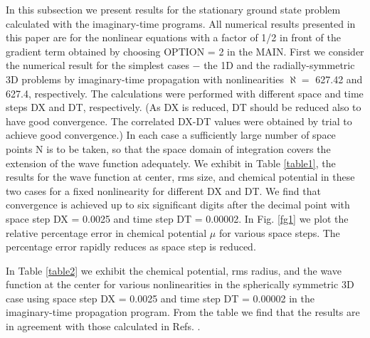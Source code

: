 \documentclass[onecolumn]{elsart3p}
\begin{document}
In this subsection we present results for the stationary ground 
state problem
calculated with the imaginary-time programs.
All numerical results presented in this paper are for the
nonlinear equations with a factor of 1/2 in front of the gradient term
obtained by choosing OPTION = 2 in the MAIN.
First we consider the numerical result for the simplest cases $-$ the
1D and the radially-symmetric 3D problems by
imaginary-time propagation with nonlinearities $\aleph %
=$ 627.42 
and
627.4, respectively. The calculations were performed with different
space and time steps DX and DT, respectively. (As DX is reduced, DT
should be reduced also to have good convergence. The correlated DX-DT
values were obtained by trial to achieve good convergence.)
In each case a
sufficiently large number of space points N is to be taken, so that the
space domain of integration covers the extension of the wave function adequately.
We exhibit in Table \ref{table1}, the results for the wave function at
center, rms
size, and chemical potential in these two cases for a fixed
nonlinearity for different DX and DT.
We find that convergence is achieved up to six significant digits after the
decimal point
with space step DX = 0.0025 and time step DT = 0.00002.
In Fig. \ref{fg1} we plot the relative percentage error in chemical
potential $\mu$ for various space steps. The percentage error rapidly
reduces as space step is reduced.

In Table \ref{table2} we exhibit the chemical potential, rms radius, and
the wave function at the center for various nonlinearities  in the
spherically symmetric 3D case using space step
DX = 0.0025 and time step DT = 0.00002 in the imaginary-time
propagation program. From the
table we find that the results are in agreement with those calculated
in Refs. \cite{Tiwari_Shukla,Bao_Tang}.
\end{document}
